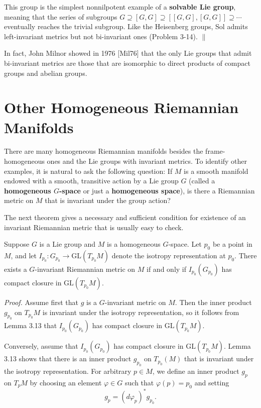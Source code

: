 \begin{example}
This group is the simplest nonnilpotent example of a \textbf{solvable Lie group}, meaning that the series of subgroups $G \supseteq [G,G] \supseteq [[G,G],[G,G]] \supseteq \cdots$ eventually reaches the trivial subgroup. Like the Heisenberg groups, Sol admits left-invariant metrics but not bi-invariant ones (Problem 3-14). $\parallel$
\end{example}

In fact, John Milnor showed in 1976 [Mil76] that the only Lie groups that admit bi-invariant metrics are those that are isomorphic to direct products of compact groups and abelian groups.

\section{Other Homogeneous Riemannian Manifolds}

There are many homogeneous Riemannian manifolds besides the frame-homogeneous ones and the Lie groups with invariant metrics. To identify other examples, it is natural to ask the following question: If $M$ is a smooth manifold endowed with a smooth, transitive action by a Lie group $G$ (called a \textbf{homogeneous $G$-space} or just a \textbf{homogeneous space}), is there a Riemannian metric on $M$ that is invariant under the group action?

The next theorem gives a necessary and sufficient condition for existence of an invariant Riemannian metric that is usually easy to check.

\begin{theorem}
\label{thm:existence-invariant-metrics-homogeneous-spaces}

Suppose $G$ is a Lie group and $M$ is a homogeneous $G$-space. Let $p_0$ be a point in $M$, and let $I_{p_0}: G_{p_0} \to \mathrm{GL}(T_{p_0}M)$ denote the isotropy representation at $p_0$. There exists a $G$-invariant Riemannian metric on $M$ if and only if $I_{p_0}(G_{p_0})$ has compact closure in $\mathrm{GL}(T_{p_0}M)$.
\end{theorem}

\textit{Proof.} Assume first that $g$ is a $G$-invariant metric on $M$. Then the inner product $g_{p_0}$ on $T_{p_0}M$ is invariant under the isotropy representation, so it follows from Lemma 3.13 that $I_{p_0}(G_{p_0})$ has compact closure in $\mathrm{GL}(T_{p_0}M)$.

Conversely, assume that $I_{p_0}(G_{p_0})$ has compact closure in $\mathrm{GL}(T_{p_0}M)$. Lemma 3.13 shows that there is an inner product $g_{p_0}$ on $T_{p_0}(M)$ that is invariant under the isotropy representation. For arbitrary $p \in M$, we define an inner product $g_p$ on $T_pM$ by choosing an element $\varphi \in G$ such that $\varphi(p) = p_0$ and setting
\[
g_p = (d\varphi_p)^* g_{p_0}.
\]

